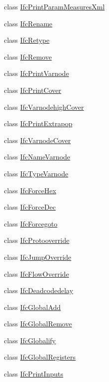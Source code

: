 \begin{DoxyCompactItemize}
\item 
class \mbox{\hyperlink{class_ifc_print_param_measures_xml}{Ifc\+Print\+Param\+Measures\+Xml}}
\item 
class \mbox{\hyperlink{class_ifc_rename}{Ifc\+Rename}}
\item 
class \mbox{\hyperlink{class_ifc_retype}{Ifc\+Retype}}
\item 
class \mbox{\hyperlink{class_ifc_remove}{Ifc\+Remove}}
\item 
class \mbox{\hyperlink{class_ifc_print_varnode}{Ifc\+Print\+Varnode}}
\item 
class \mbox{\hyperlink{class_ifc_print_cover}{Ifc\+Print\+Cover}}
\item 
class \mbox{\hyperlink{class_ifc_varnodehigh_cover}{Ifc\+Varnodehigh\+Cover}}
\item 
class \mbox{\hyperlink{class_ifc_print_extrapop}{Ifc\+Print\+Extrapop}}
\item 
class \mbox{\hyperlink{class_ifc_varnode_cover}{Ifc\+Varnode\+Cover}}
\item 
class \mbox{\hyperlink{class_ifc_name_varnode}{Ifc\+Name\+Varnode}}
\item 
class \mbox{\hyperlink{class_ifc_type_varnode}{Ifc\+Type\+Varnode}}
\item 
class \mbox{\hyperlink{class_ifc_force_hex}{Ifc\+Force\+Hex}}
\item 
class \mbox{\hyperlink{class_ifc_force_dec}{Ifc\+Force\+Dec}}
\item 
class \mbox{\hyperlink{class_ifc_forcegoto}{Ifc\+Forcegoto}}
\item 
class \mbox{\hyperlink{class_ifc_protooverride}{Ifc\+Protooverride}}
\item 
class \mbox{\hyperlink{class_ifc_jump_override}{Ifc\+Jump\+Override}}
\item 
class \mbox{\hyperlink{class_ifc_flow_override}{Ifc\+Flow\+Override}}
\item 
class \mbox{\hyperlink{class_ifc_deadcodedelay}{Ifc\+Deadcodedelay}}
\item 
class \mbox{\hyperlink{class_ifc_global_add}{Ifc\+Global\+Add}}
\item 
class \mbox{\hyperlink{class_ifc_global_remove}{Ifc\+Global\+Remove}}
\item 
class \mbox{\hyperlink{class_ifc_globalify}{Ifc\+Globalify}}
\item 
class \mbox{\hyperlink{class_ifc_global_registers}{Ifc\+Global\+Registers}}
\item 
class \mbox{\hyperlink{class_ifc_print_inputs}{Ifc\+Print\+Inputs}}

\end{DoxyCompactItemize}
